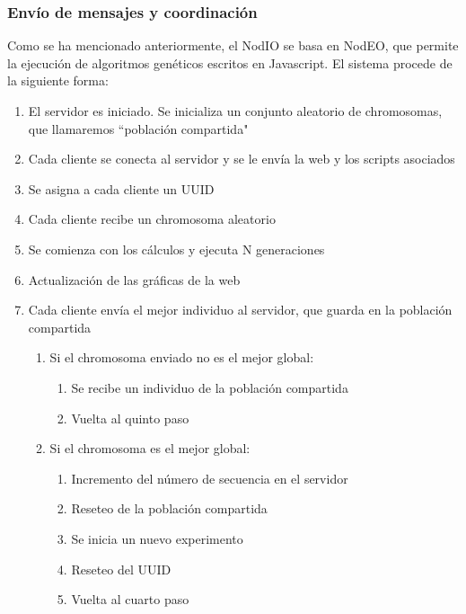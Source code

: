 \documentclass[runningheads,a4paper]{llncs}
\begin{document}
\subsubsection{Env\'io de mensajes y coordinaci\'on}
Como se ha mencionado anteriormente, el NodIO se basa en NodEO, que permite la
ejecuci\'on de algoritmos gen\'eticos escritos en Javascript. El sistema procede
de la siguiente forma:
\begin{enumerate}
  \item El servidor es iniciado. Se inicializa un conjunto aleatorio de chromosomas,
  que llamaremos ``poblaci\'on compartida"
  \item Cada cliente se conecta al servidor y se le envía la web y los scripts asociados
  \item Se asigna a cada cliente un UUID
  \item Cada cliente recibe un chromosoma aleatorio
  \item Se comienza con los c\'alculos
  y ejecuta N generaciones
  \item Actualizaci\'on de las gr\'aficas de la web
  \item Cada cliente envía el mejor individuo al servidor, que guarda en la poblaci\'on compartida
  \begin{enumerate}
    \item Si el chromosoma enviado no es el mejor global:
      \begin{enumerate}
        \item Se recibe un individuo de la poblaci\'on compartida
        \item Vuelta al quinto paso
      \end{enumerate}
    \item Si el chromosoma es el mejor global:
      \begin{enumerate}
        \item Incremento del n\'umero de secuencia en el servidor
        \item Reseteo de la poblaci\'on compartida
        \item Se inicia un nuevo experimento
        \item Reseteo del UUID
        \item Vuelta al cuarto paso
      \end{enumerate}
  \end{enumerate}
\end{enumerate}
\end{document}
